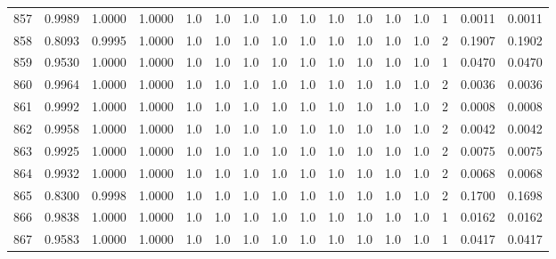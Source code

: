 \begin{tabular}{lrrrrrrrrrrrrrrr}
857 &      0.9989 &  1.0000 &  1.0000 &     1.0 &     1.0 &     1.0 &     1.0 &     1.0 &     1.0 &     1.0 &      1.0 &        1.0 &      1 &                    0.0011 &                     0.0011 \\
858 &      0.8093 &  0.9995 &  1.0000 &     1.0 &     1.0 &     1.0 &     1.0 &     1.0 &     1.0 &     1.0 &      1.0 &        1.0 &      2 &                    0.1907 &                     0.1902 \\
859 &      0.9530 &  1.0000 &  1.0000 &     1.0 &     1.0 &     1.0 &     1.0 &     1.0 &     1.0 &     1.0 &      1.0 &        1.0 &      1 &                    0.0470 &                     0.0470 \\
860 &      0.9964 &  1.0000 &  1.0000 &     1.0 &     1.0 &     1.0 &     1.0 &     1.0 &     1.0 &     1.0 &      1.0 &        1.0 &      2 &                    0.0036 &                     0.0036 \\
861 &      0.9992 &  1.0000 &  1.0000 &     1.0 &     1.0 &     1.0 &     1.0 &     1.0 &     1.0 &     1.0 &      1.0 &        1.0 &      2 &                    0.0008 &                     0.0008 \\
862 &      0.9958 &  1.0000 &  1.0000 &     1.0 &     1.0 &     1.0 &     1.0 &     1.0 &     1.0 &     1.0 &      1.0 &        1.0 &      2 &                    0.0042 &                     0.0042 \\
863 &      0.9925 &  1.0000 &  1.0000 &     1.0 &     1.0 &     1.0 &     1.0 &     1.0 &     1.0 &     1.0 &      1.0 &        1.0 &      2 &                    0.0075 &                     0.0075 \\
864 &      0.9932 &  1.0000 &  1.0000 &     1.0 &     1.0 &     1.0 &     1.0 &     1.0 &     1.0 &     1.0 &      1.0 &        1.0 &      2 &                    0.0068 &                     0.0068 \\
865 &      0.8300 &  0.9998 &  1.0000 &     1.0 &     1.0 &     1.0 &     1.0 &     1.0 &     1.0 &     1.0 &      1.0 &        1.0 &      2 &                    0.1700 &                     0.1698 \\
866 &      0.9838 &  1.0000 &  1.0000 &     1.0 &     1.0 &     1.0 &     1.0 &     1.0 &     1.0 &     1.0 &      1.0 &        1.0 &      1 &                    0.0162 &                     0.0162 \\
867 &      0.9583 &  1.0000 &  1.0000 &     1.0 &     1.0 &     1.0 &     1.0 &     1.0 &     1.0 &     1.0 &      1.0 &        1.0 &      1 &                    0.0417 &                     0.0417 \\

\end{tabular}
